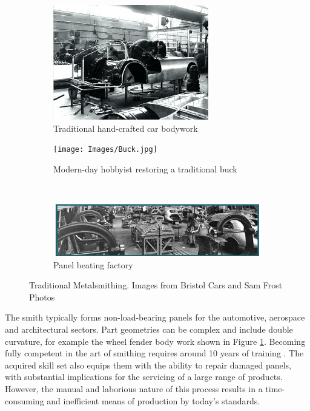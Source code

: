 \begin{figure}[h]
\centering
%
\begin{subfigure}[t]{.45\textwidth}
  \centering
  \includegraphics[height=5cm]{Images/OldCar.png}  
  \caption{Traditional hand-crafted car bodywork}
  \label{fig:OldCar}
\end{subfigure}
\begin{subfigure}[t]{.45\textwidth}
  \centering
  \texttt{[image: Images/Buck.jpg]}  
  \caption{Modern-day hobbyist restoring a traditional buck}
  \label{fig:NewBuck}
\end{subfigure}\\[1ex]
%
\begin{subfigure}{.9\textwidth}
  \centering
  \includegraphics[width=\linewidth]{Images/OldFactory.png}  
  \caption{Panel beating factory}
  \label{fig:OldFactory}
\end{subfigure}
%
\caption{Traditional Metalsmithing. Images from Bristol Cars and Sam Frost Photos}
\label{fig:Background}
\end{figure}

The smith typically forms non-load-bearing panels for the automotive, aerospace and architectural sectors. Part geometries can be complex and include double curvature, for example the wheel fender body work shown in Figure \ref{fig:OldCar}. Becoming fully competent in the art of smithing requires around 10 years of training \citep{Goodwin2020BehindBeaters}. The acquired skill set also equips them with the ability to repair damaged panels, with substantial implications for the servicing of a large range of products. However, the manual and laborious nature of this process results in a time-consuming and inefficient means of production by today's standards.

